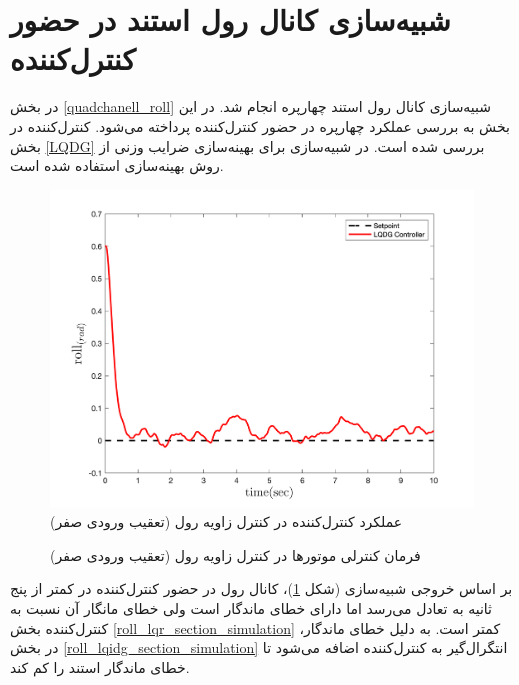 \section{شبیه‌سازی کانال رول استند در حضور کنترل‌کننده }\label{roll_LQDG_section_simulation}
در بخش
\ref{quadchanell_roll}
شبیه‌سازی کانال رول استند چهارپره انجام شد. در این بخش به بررسی عملکرد چهارپره در حضور کنترل‌کننده  پرداخته می‌شود. کنترل‌کننده  در بخش
\ref{LQDG}
بررسی شده است.
 در شبیه‌سازی برای بهینه‌سازی ضرایب وزنی  از روش بهینه‌سازی
 \cite{Karimi2010}
استفاده شده است.
\begin{figure}[H]
	\includegraphics[width=.48\linewidth]{../Figures/MIL/LQDG/Roll/lqdg_roll.png}
	\centering
	\caption{عملكرد کنترل‌کننده  در کنترل زاويه رول (تعقیب ورودی صفر)}
	\label{lqdg_roll_fig_simulation}
\end{figure}
\begin{figure}[H]
	\centering
	\caption{‫‪فرمان کنترلی موتورها در کنترل زاویه رول (تعقیب ورودی صفر)}
\end{figure}

بر اساس خروجی شبیه‌سازی (شکل
\ref{lqdg_roll_fig_simulation})،
کانال رول در حضور کنترل‌کننده  در کمتر از پنج ثانیه به تعادل می‌رسد اما دارای خطای ماندگار است ولی خطای 
مانگار آن نسبت به کنترل‌کننده
بخش
\ref{roll_lqr_section_simulation}
کمتر است. به دلیل خطای ماندگار، در بخش
\ref{roll_lqidg_section_simulation}
انتگرال‌گیر به کنترل‌کننده اضافه می‌شود تا خطای ماندگار استند را کم کند.
